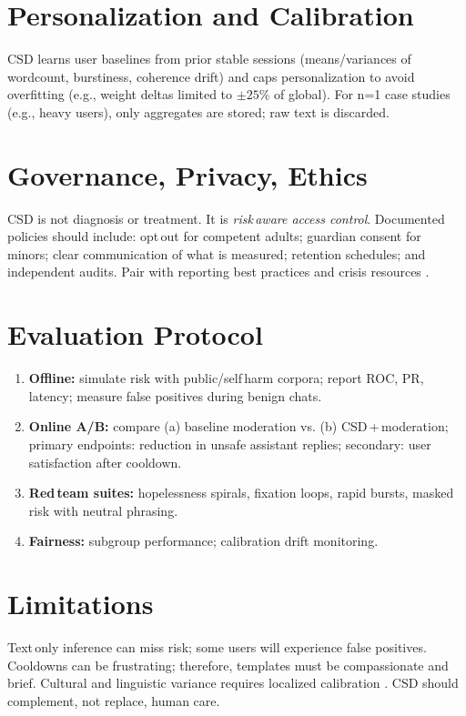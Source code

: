 \documentclass[11pt]{article}
\begin{document}
\section{Personalization and Calibration}
CSD learns user baselines from prior stable sessions (means/variances of wordcount, burstiness, coherence drift) and caps personalization to avoid overfitting (e.g., weight deltas limited to \(\pm25\%\) of global). For n=1 case studies (e.g., heavy users), only aggregates are stored; raw text is discarded.

\section{Governance, Privacy, Ethics}
CSD is not diagnosis or treatment. It is \emph{risk\,aware access control}. Documented policies should include: opt\,out for competent adults; guardian consent for minors; clear communication of what is measured; retention schedules; and independent audits. Pair with reporting best practices and crisis resources \parencite{WHO2023,Lifeline988}.

\section{Evaluation Protocol}
\begin{enumerate}[leftmargin=1.35em]
  \item \textbf{Offline:} simulate risk with public/self\,harm corpora; report ROC, PR, latency; measure false positives during benign chats.
  \item \textbf{Online A/B:} compare (a) baseline moderation vs. (b) CSD\,+\,moderation; primary endpoints: reduction in unsafe assistant replies; secondary: user satisfaction after cooldown.
  \item \textbf{Red\,team suites:} hopelessness spirals, fixation loops, rapid bursts, masked risk with neutral phrasing.
  \item \textbf{Fairness:} subgroup performance; calibration drift monitoring.
\end{enumerate}

\section{Limitations}
Text\,only inference can miss risk; some users will experience false positives. Cooldowns can be frustrating; therefore, templates must be compassionate and brief. Cultural and linguistic variance requires localized calibration \parencite{Huckvale2019}. CSD should complement, not replace, human care.
\end{document}
